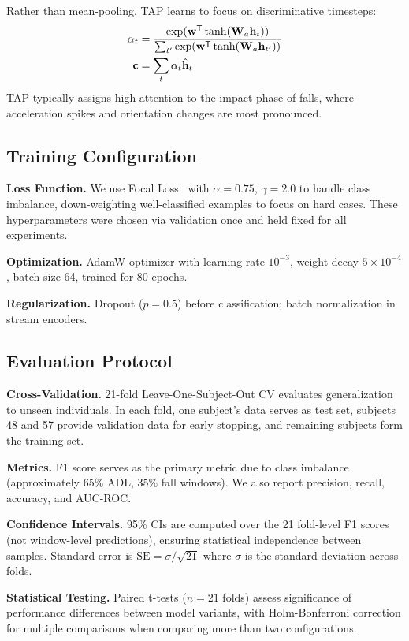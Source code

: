 Rather than mean-pooling, TAP learns to focus on discriminative timesteps:
\begin{align}
\alpha_t &= \frac{\exp(\mathbf{w}^{\mathsf{T}} \tanh(\mathbf{W}_a \mathbf{h}_t))}{\sum_{t'} \exp(\mathbf{w}^{\mathsf{T}} \tanh(\mathbf{W}_a \mathbf{h}_{t'}))} \\
\mathbf{c} &= \sum_t \alpha_t \hat{\mathbf{h}}_t
\end{align}
TAP typically assigns high attention to the impact phase of falls, where acceleration spikes and orientation changes are most pronounced.

\subsection{Training Configuration}
\label{subsec:training}

\textbf{Loss Function.} We use Focal Loss~\cite{lin2017focal} with $\alpha=0.75$, $\gamma=2.0$ to handle class imbalance, down-weighting well-classified examples to focus on hard cases. These hyperparameters were chosen via validation once and held fixed for all experiments.

\textbf{Optimization.} AdamW optimizer with learning rate $10^{-3}$, weight decay $5 \times 10^{-4}$, batch size 64, trained for 80 epochs.

\textbf{Regularization.} Dropout ($p=0.5$) before classification; batch normalization in stream encoders.

\subsection{Evaluation Protocol}
\label{subsec:evaluation}

\textbf{Cross-Validation.} 21-fold Leave-One-Subject-Out CV evaluates generalization to unseen individuals. In each fold, one subject's data serves as test set, subjects 48 and 57 provide validation data for early stopping, and remaining subjects form the training set.

\textbf{Metrics.} F1 score serves as the primary metric due to class imbalance (approximately 65\% ADL, 35\% fall windows). We also report precision, recall, accuracy, and AUC-ROC.

\textbf{Confidence Intervals.} 95\% CIs are computed over the 21 fold-level F1 scores (not window-level predictions), ensuring statistical independence between samples. Standard error is $\text{SE} = \sigma / \sqrt{21}$ where $\sigma$ is the standard deviation across folds.

\textbf{Statistical Testing.} Paired t-tests ($n=21$ folds) assess significance of performance differences between model variants, with Holm-Bonferroni correction for multiple comparisons when comparing more than two configurations.
